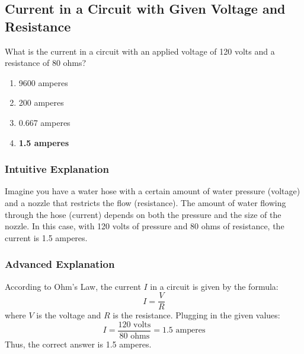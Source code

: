 \subsection{Current in a Circuit with Given Voltage and Resistance}
\label{T5D07}

\begin{tcolorbox}[colback=gray!10!white,colframe=black!75!black,title=T5D07]
What is the current in a circuit with an applied voltage of 120 volts and a resistance of 80 ohms?
\begin{enumerate}[noitemsep]
    \item 9600 amperes
    \item 200 amperes
    \item 0.667 amperes
    \item \textbf{1.5 amperes}
\end{enumerate}
\end{tcolorbox}

\subsubsection{Intuitive Explanation}
Imagine you have a water hose with a certain amount of water pressure (voltage) and a nozzle that restricts the flow (resistance). The amount of water flowing through the hose (current) depends on both the pressure and the size of the nozzle. In this case, with 120 volts of pressure and 80 ohms of resistance, the current is 1.5 amperes.

\subsubsection{Advanced Explanation}
According to Ohm's Law, the current \( I \) in a circuit is given by the formula:
\[
I = \frac{V}{R}
\]
where \( V \) is the voltage and \( R \) is the resistance. Plugging in the given values:
\[
I = \frac{120 \text{ volts}}{80 \text{ ohms}} = 1.5 \text{ amperes}
\]
Thus, the correct answer is 1.5 amperes.